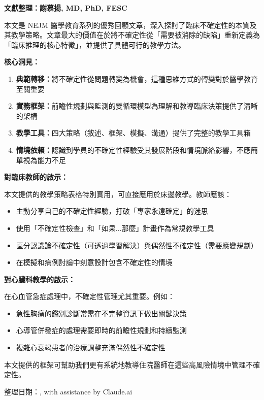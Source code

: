 \documentclass[12pt,a4paper]{article}
\newcommand{\mydate}{\DTMtoday}
\begin{document}
\begin{importantbox}
\textbf{文獻整理：謝慕揚, MD, PhD, FESC}

本文是 NEJM 醫學教育系列的優秀回顧文章，深入探討了臨床不確定性的本質及其教學策略。文章最大的價值在於將不確定性從「需要被消除的缺陷」重新定義為「臨床推理的核心特徵」，並提供了具體可行的教學方法。

\textbf{核心洞見：}

\begin{enumerate}
\item \textbf{典範轉移：}將不確定性從問題轉變為機會，這種思維方式的轉變對於醫學教育至關重要
\item \textbf{實務框架：}前瞻性規劃與監測的雙循環模型為理解和教導臨床決策提供了清晰的架構
\item \textbf{教學工具：}四大策略（敘述、框架、模擬、溝通）提供了完整的教學工具箱
\item \textbf{情境依賴：}認識到學員的不確定性經驗受其發展階段和情境脈絡影響，不應簡單視為能力不足
\end{enumerate}

\textbf{對臨床教師的啟示：}

本文提供的教學策略表格特別實用，可直接應用於床邊教學。教師應該：
\begin{itemize}
\item 主動分享自己的不確定性經驗，打破「專家永遠確定」的迷思
\item 使用「不確定性檢查」和「如果...那麼」計畫作為常規教學工具
\item 區分認識論不確定性（可透過學習解決）與偶然性不確定性（需要應變規劃）
\item 在模擬和病例討論中刻意設計包含不確定性的情境
\end{itemize}

\textbf{對心臟科教學的啟示：}

在心血管急症處理中，不確定性管理尤其重要。例如：
\begin{itemize}
\item 急性胸痛的鑑別診斷常需在不完整資訊下做出關鍵決策
\item 心導管併發症的處理需要即時的前瞻性規劃和持續監測
\item 複雜心衰竭患者的治療調整充滿偶然性不確定性
\end{itemize}

本文提供的框架可幫助我們更有系統地教導住院醫師在這些高風險情境中管理不確定性。

整理日期：\mydate, with assistance by Claude.ai
\end{importantbox}
\end{document}
